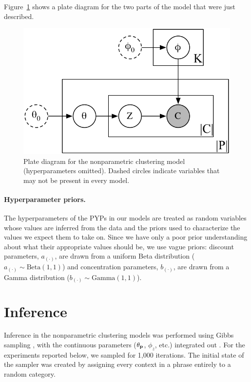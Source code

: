 \noindent Figure~\ref{fig:np_plate} shows a plate diagram for the two parts of the model that were just described.

\begin{figure}
\begin{center}
\includegraphics[scale=0.75]{pyp_clustering/np_plate.pdf}
\vspace{-0.3cm}
\end{center}
\caption{Plate diagram for the nonparametric clustering model (hyperparameters omitted).  Dashed circles indicate variables that may not be present in every model.}
\label{fig:np_plate}
\end{figure}

\paragraph{Hyperparameter priors.} The hyperparameters of the PYPs in our models are treated as random variables whose values are inferred from the data and the priors used to characterize the values we expect them to take on.  Since we have only a poor prior understanding about what their appropriate values should be, we use vague priors: discount parameters, $a_{(\cdot)}$, are drawn from a uniform Beta distribution ($a_{(\cdot)} \sim \textrm{Beta}(1,1)$) and concentration parameters, $b_{(\cdot)}$, are drawn from a Gamma distribution ($b_{(\cdot)} \sim \textrm{Gamma}(1,1)$).

\section{Inference}

Inference in the nonparametric clustering models was performed using Gibbs sampling \citep{geman:1984}, with the continuous parameters ($\theta_{\textbf{p}}$, $\phi_z$, etc.) integrated out \citep{blunsom:2009}.  For the experiments reported below, we sampled for 1,000 iterations.  The initial state of the sampler was created by assigning every context in a phrase entirely to a random category.

